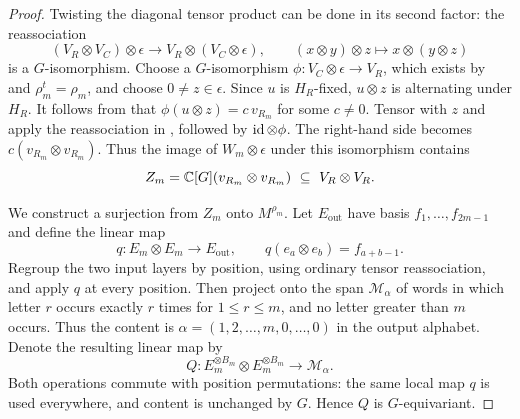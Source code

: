 \begin{proof}
Twisting the diagonal tensor product can be done in its second factor:
the reassociation
\begin{equation}
 (V_R\otimes V_C)\otimes\epsilon
 \longrightarrow V_R\otimes(V_C\otimes\epsilon),\qquad
 (x\otimes y)\otimes z\longmapsto x\otimes(y\otimes z)
 \label{dom:twist-one-factor}
\end{equation}
is a $G$-isomorphism.  Choose a $G$-isomorphism
$\phi:V_C\otimes\epsilon\longrightarrow V_R$, which exists by
 and $\rho_m^t=\rho_m$, and choose $0\ne z\in\epsilon$.
Since $u$ is $H_R$-fixed, $u\otimes z$ is alternating under $H_R$.
It follows from  that
$\phi(u\otimes z)=c\,v_{R_m}$ for some $c\ne0$.
Tensor  with $z$ and apply the reassociation in
, followed by $\operatorname{id}\otimes\phi$.
The right-hand side becomes $c(v_{R_m}\otimes v_{R_m})$.
Thus the image of $W_m\otimes\epsilon$ under this isomorphism contains
\begin{equation}
 Z_m=\mathbb C[G](v_{R_m}\otimes v_{R_m})
 \ \subseteq\ V_R\otimes V_R.
 \label{dom:repeated-row-cyclic}
\end{equation}

We construct a surjection from $Z_m$ onto $M^{\rho_m}$.
Let $E_{\mathrm{out}}$ have basis $f_1,\ldots,f_{2m-1}$ and define the linear map
\[
 q:E_m\otimes E_m\longrightarrow E_{\mathrm{out}},\qquad
 q(e_a\otimes e_b)=f_{a+b-1}.
\]
Regroup the two input layers by position, using ordinary tensor
reassociation, and apply $q$ at every position.  Then project onto the
span $\mathcal M_\alpha$ of words in which letter $r$ occurs exactly $r$
times for $1\le r\le m$, and no letter greater than $m$ occurs.
Thus the content is $\alpha=(1,2,\ldots,m,0,\ldots,0)$ in the output
alphabet.  Denote the resulting linear map by
\begin{equation}
 Q:E_m^{\otimes B_m}\otimes E_m^{\otimes B_m}
 \longrightarrow\mathcal M_\alpha.
 \label{dom:pair-letter-map}
\end{equation}
Both operations commute with position permutations: the same local map
$q$ is used everywhere, and content is unchanged by $G$.  Hence $Q$ is
$G$-equivariant.


\end{proof}
